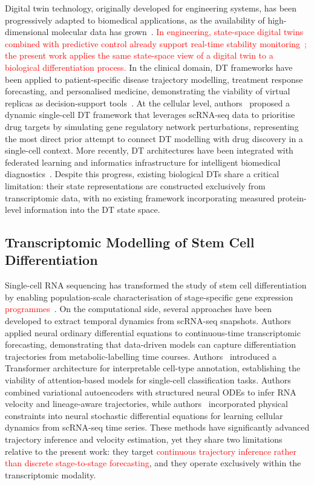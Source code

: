 \documentclass[5p,times,twocolumn]{elsarticle}
\newcommand{\rtag}[1]{}
\newcommand{\rev}[2]{\rtag{#1}\textcolor{red}{#2}}
\newcommand{\lang}[1]{\textcolor{red}{#1}}
\begin{document}
Digital twin technology, originally developed for
engineering systems, has been progressively adapted
to biomedical applications, as the availability of
high-dimensional molecular data has
grown~\cite{masison2021modular}.
\rev{R1.16}{In engineering, state-space digital twins combined
  with predictive control already support real-time stability
  monitoring~\cite{pandey2026statespace}; the present work
  applies the same state-space view of a digital twin to a
  biological differentiation process.}
In the clinical domain, DT frameworks have been
applied to patient-specific disease trajectory
modelling, treatment response forecasting, and
personalised medicine, demonstrating the viability
of virtual replicas as decision-support
tools~\cite{hansen2024transcriptomics}.
At the cellular level, authors~\cite{li2022dynamic}
proposed a dynamic single-cell DT framework
that leverages scRNA-seq data to prioritise
drug targets by simulating gene regulatory
network perturbations, representing the most
direct prior attempt to connect DT modelling
with drug discovery in a single-cell context.
More recently, DT architectures have been
integrated with federated learning and
informatics infrastructure for intelligent
biomedical diagnostics~\cite{qu2023dtqfl}.
Despite this progress, existing biological DTs
share a critical limitation: their state
representations are constructed exclusively from
transcriptomic data, with no existing framework
incorporating measured protein-level information
into the DT state space.

\subsection{\textbf{Transcriptomic Modelling of Stem Cell
    Differentiation}}

Single-cell RNA sequencing has transformed the
study of stem cell differentiation by enabling
population-scale characterisation of stage-specific
gene expression \lang{programmes}~\cite{jerber2021population}.
On the computational side, several approaches have
been developed to extract temporal dynamics from
scRNA-seq snapshots.
Authors~\cite{erbe2023transcriptomic} applied neural ordinary
differential equations to continuous-time
transcriptomic forecasting, demonstrating that
data-driven models can capture differentiation
trajectories from metabolic-labelling time courses.
Authors~\cite{chen2023transformer} introduced
a Transformer architecture for interpretable
cell-type annotation, establishing the viability
of attention-based models for single-cell
classification tasks.
Authors~\cite{farrell2023inferring} combined
variational autoencoders with structured neural
ODEs to infer RNA velocity and lineage-aware
trajectories, while authors~\cite{jiang2024physics}
incorporated physical constraints into neural
stochastic differential equations for learning
cellular dynamics from scRNA-seq time series.
These methods have significantly advanced
trajectory inference and velocity estimation,
yet they share two limitations relative to the
present work: they target \lang{continuous trajectory
  inference rather than discrete stage-to-stage
  forecasting}, and they operate exclusively within
the transcriptomic modality.
\end{document}
